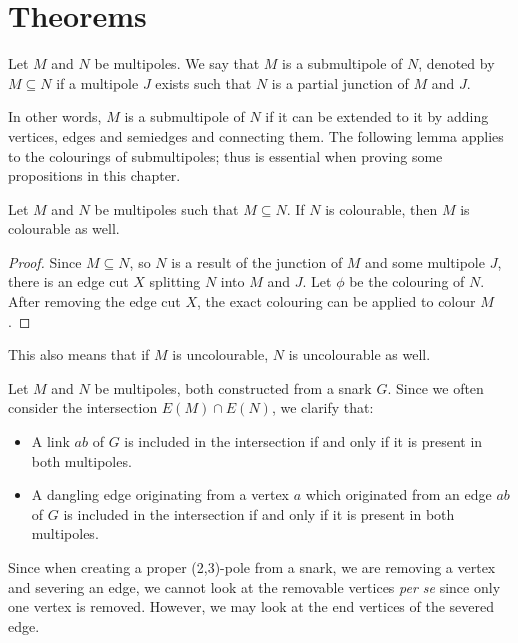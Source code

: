 \section{Theorems}\label{sec:result-theorems}

\begin{definition}
	Let $M$ and $N$ be multipoles. We say that $M$ is a submultipole of $N$, denoted by $M\subseteq N$ if a multipole $J$ exists such that $N$ is a partial junction of $M$ and $J$.
\end{definition}

In other words, $M$ is a submultipole of $N$ if it can be extended to it by adding vertices, edges and semiedges and connecting them. The following lemma applies to the colourings of submultipoles; thus is essential when proving some propositions in this chapter.

\begin{lemma}
	Let $M$ and $N$ be multipoles such that $M\subseteq N$. If $N$ is colourable, then $M$ is colourable as well.
	\label{lem:submultipole-uncolourable}
\end{lemma}

\begin{proof}
	Since $M\subseteq N$, so $N$ is a result of the junction of $M$ and some multipole $J$, there is an edge cut $X$ splitting $N$ into $M$ and $J$. Let $\phi$ be the colouring of $N$. After removing the edge cut $X$, the exact colouring can be applied to colour $M$.
\end{proof}

This also means that if $M$ is uncolourable, $N$ is uncolourable as well.

Let $M$ and $N$ be multipoles, both constructed from a snark $G$. Since we often consider the intersection $E(M)\cap E(N)$, we clarify that:
\begin{itemize}
	\item A link $ab$ of $G$ is included in the intersection if and only if it is present in both multipoles.
	\item A dangling edge originating from a vertex $a$ which originated from an edge $ab$ of $G$ is included in the intersection if and only if it is present in both multipoles.
\end{itemize}

Since when creating a proper (2,3)-pole from a snark, we are removing a vertex and severing an edge, we cannot look at the removable vertices \textit{per se} since only one vertex is removed. However, we may look at the end vertices of the severed edge.

